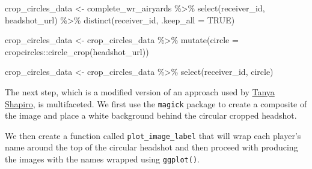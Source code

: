 \documentclass[
  letterpaper,
]{krantz}
\newenvironment{Shaded}{\begin{snugshade}}{\end{snugshade}}
\newcommand{\AttributeTok}[1]{\textcolor[rgb]{0.40,0.45,0.13}{#1}}
\newcommand{\ConstantTok}[1]{\textcolor[rgb]{0.56,0.35,0.01}{#1}}
\newcommand{\FunctionTok}[1]{\textcolor[rgb]{0.28,0.35,0.67}{#1}}
\newcommand{\NormalTok}[1]{\textcolor[rgb]{0.00,0.23,0.31}{#1}}
\newcommand{\OtherTok}[1]{\textcolor[rgb]{0.00,0.23,0.31}{#1}}
\newcommand{\SpecialCharTok}[1]{\textcolor[rgb]{0.37,0.37,0.37}{#1}}
\begin{document}
\begin{Shaded}
\begin{Highlighting}[]
\NormalTok{crop\_circles\_data }\OtherTok{\textless{}{-}}\NormalTok{ complete\_wr\_airyards }\SpecialCharTok{\%\textgreater{}\%}
  \FunctionTok{select}\NormalTok{(receiver\_id, headshot\_url) }\SpecialCharTok{\%\textgreater{}\%}
  \FunctionTok{distinct}\NormalTok{(receiver\_id, }\AttributeTok{.keep\_all =} \ConstantTok{TRUE}\NormalTok{)}

\NormalTok{crop\_circles\_data }\OtherTok{\textless{}{-}}\NormalTok{ crop\_circles\_data }\SpecialCharTok{\%\textgreater{}\%}
  \FunctionTok{mutate}\NormalTok{(}\AttributeTok{circle =}\NormalTok{ cropcircles}\SpecialCharTok{::}\FunctionTok{circle\_crop}\NormalTok{(headshot\_url))}

\NormalTok{crop\_circles\_data }\OtherTok{\textless{}{-}}\NormalTok{ crop\_circles\_data }\SpecialCharTok{\%\textgreater{}\%}
  \FunctionTok{select}\NormalTok{(receiver\_id, circle)}
\end{Highlighting}
\end{Shaded}

The next step, which is a modified version of an approach used by
\href{https://twitter.com/tanya_shapiro}{Tanya Shapiro}, is
multifaceted. We first use the \texttt{magick} package to create a
composite of the image and place a white background behind the circular
cropped headshot.

We then create a function called \texttt{plot\_image\_label} that will
wrap each player's name around the top of the circular headshot and then
proceed with producing the images with the names wrapped using
\texttt{ggplot()}.
\end{document}

